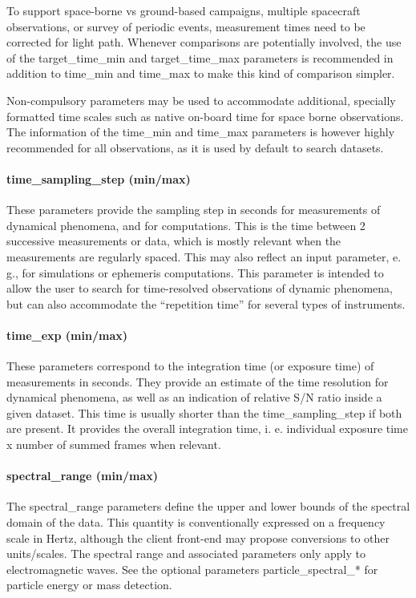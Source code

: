 \documentclass[11pt,a4paper]{ivoa}
\begin{document}
To support space-borne vs ground-based campaigns, multiple spacecraft observations, or survey of periodic events, measurement times need to be corrected for light path. Whenever comparisons are potentially involved, the use of the target\_time\_min and target\_time\_max parameters is recommended in addition to time\_min and time\_max to make this kind of comparison simpler.

Non-compulsory parameters may be used to accommodate additional, specially formatted time scales such as native on-board time for space borne observations. The information of the time\_min and time\_max parameters is however highly recommended for all observations, as it is used by default to search datasets.

\paragraph{time\_sampling\_step (min/max)}

These parameters provide the sampling step in seconds for measurements of dynamical phenomena, and for computations. This is the time between 2 successive measurements or data, which is mostly relevant when the measurements are regularly spaced. This may also reflect an input parameter, e. g., for simulations or ephemeris computations. This parameter is intended to allow the user to search for time-resolved observations of dynamic phenomena, but can also accommodate the ``repetition time'' for several types of instruments.

\paragraph{time\_exp (min/max)}

These parameters correspond to the integration time (or exposure time) of measurements in seconds. They provide an estimate of the time resolution for dynamical phenomena, as well as an indication of relative S/N ratio inside a given dataset. This time is usually shorter than the time\_sampling\_step if both are present. It provides the overall integration time, i. e. individual exposure time x number of summed frames when relevant. 

\paragraph{spectral\_range (min/max)}

The spectral\_range parameters define the upper and lower bounds of the spectral domain of the data. This quantity is conventionally expressed on a frequency scale in Hertz, although the client front-end may propose conversions to other units/scales. The spectral range and associated parameters only apply to electromagnetic waves. See the optional parameters particle\_spectral\_* for particle energy or mass detection.
\end{document}
